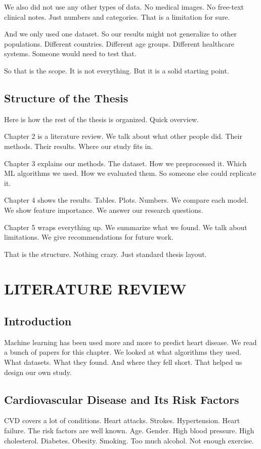 \documentclass[12pt, a4paper, oneside]{book}
\begin{document}
We also did not use any other types of data. No medical images. No free-text clinical notes. Just numbers and categories. That is a limitation for sure.

And we only used one dataset. So our results might not generalize to other populations. Different countries. Different age groups. Different healthcare systems. Someone would need to test that.

So that is the scope. It is not everything. But it is a solid starting point.

\section{Structure of the Thesis}
Here is how the rest of the thesis is organized. Quick overview.

Chapter 2 is a literature review. We talk about what other people did. Their methods. Their results. Where our study fits in.

Chapter 3 explains our methods. The dataset. How we preprocessed it. Which ML algorithms we used. How we evaluated them. So someone else could replicate it.

Chapter 4 shows the results. Tables. Plots. Numbers. We compare each model. We show feature importance. We answer our research questions.

Chapter 5 wraps everything up. We summarize what we found. We talk about limitations. We give recommendations for future work.

That is the structure. Nothing crazy. Just standard thesis layout.

\chapter{LITERATURE REVIEW}

\section{Introduction}
Machine learning has been used more and more to predict heart disease. We read a bunch of papers for this chapter. We looked at what algorithms they used. What datasets. What they found. And where they fell short. That helped us design our own study.

\section{Cardiovascular Disease and Its Risk Factors}
CVD covers a lot of conditions. Heart attacks. Strokes. Hypertension. Heart failure. The risk factors are well known. Age. Gender. High blood pressure. High cholesterol. Diabetes. Obesity. Smoking. Too much alcohol. Not enough exercise.
\end{document}
